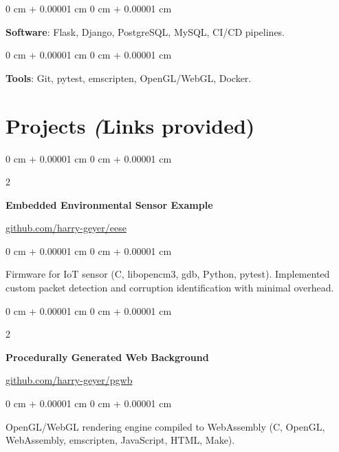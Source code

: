\documentclass[10pt, letterpaper]{article}
\newenvironment{onecolentry}{
    \begin{adjustwidth}{
        0 cm + 0.00001 cm
    }{
        0 cm + 0.00001 cm
    }
}{
    \end{adjustwidth}
}
\newenvironment{twocolentry}[2][]{
    \onecolentry
    \def\secondColumn{#2}
    \setcolumnwidth{\fill, 4.5 cm}
    \begin{paracol}{2}
}{
    \switchcolumn \raggedleft \secondColumn
    \end{paracol}
    \endonecolentry
}
\begin{document}
        \vspace{0.2 cm}

        \begin{onecolentry}
            \textbf{Software}: Flask, Django, PostgreSQL, MySQL, CI/CD pipelines.
        \end{onecolentry}

        \vspace{0.2 cm}

        \begin{onecolentry}
            \textbf{Tools}: Git, pytest, emscripten, OpenGL/WebGL, Docker.
        \end{onecolentry}

    \newpage
    \section{Projects \textit(Links provided)}

        \begin{twocolentry}{\href{https://github.com/harry-geyer/eese}{github.com/harry-geyer/eese}}
            \textbf{Embedded Environmental Sensor Example}
        \end{twocolentry}

        \vspace{0.10 cm}
        \begin{onecolentry}
            Firmware for IoT sensor (C, libopencm3, gdb, Python, pytest). Implemented custom packet detection and corruption identification with minimal overhead.
        \end{onecolentry}

        \vspace{0.2 cm}

        \begin{twocolentry}{\href{https://github.com/harry-geyer/pgwb}{github.com/harry-geyer/pgwb}}
            \textbf{Procedurally Generated Web Background}
        \end{twocolentry}

        \vspace{0.10 cm}
        \begin{onecolentry}
            OpenGL/WebGL rendering engine compiled to WebAssembly (C, OpenGL, WebAssembly, emscripten, JavaScript, HTML, Make).
        \end{onecolentry}

        \vspace{0.2 cm}

\end{document}
